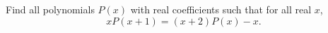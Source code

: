 Find all polynomials $P(x)$ with real coefficients such that for all real $x$,
\[xP(x+1)=(x+2)P(x)-x.\]
